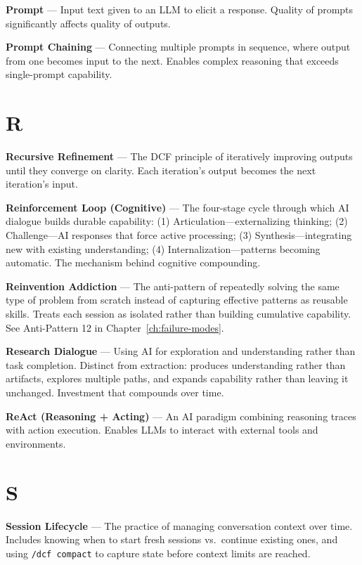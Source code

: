 \textbf{Prompt} --- Input text given to an LLM to elicit a response. Quality of prompts significantly affects quality of outputs.

\textbf{Prompt Chaining} --- Connecting multiple prompts in sequence, where output from one becomes input to the next. Enables complex reasoning that exceeds single-prompt capability.

\section*{R}

\textbf{Recursive Refinement} --- The DCF principle of iteratively improving outputs until they converge on clarity. Each iteration's output becomes the next iteration's input.

\textbf{Reinforcement Loop (Cognitive)} --- The four-stage cycle through which AI dialogue builds durable capability: (1) Articulation---externalizing thinking; (2) Challenge---AI responses that force active processing; (3) Synthesis---integrating new with existing understanding; (4) Internalization---patterns becoming automatic. The mechanism behind cognitive compounding.

\textbf{Reinvention Addiction} --- The anti-pattern of repeatedly solving the same type of problem from scratch instead of capturing effective patterns as reusable skills. Treats each session as isolated rather than building cumulative capability. See Anti-Pattern 12 in Chapter~\ref{ch:failure-modes}.

\textbf{Research Dialogue} --- Using AI for exploration and understanding rather than task completion. Distinct from extraction: produces understanding rather than artifacts, explores multiple paths, and expands capability rather than leaving it unchanged. Investment that compounds over time.

\textbf{ReAct (Reasoning + Acting)} --- An AI paradigm combining reasoning traces with action execution. Enables LLMs to interact with external tools and environments.

\section*{S}

\textbf{Session Lifecycle} --- The practice of managing conversation context over time. Includes knowing when to start fresh sessions vs.\ continue existing ones, and using \texttt{/dcf compact} to capture state before context limits are reached.

